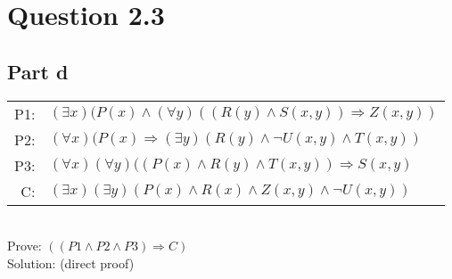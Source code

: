 \documentclass{article}
\begin{document}
	\section{Question 2.3}
		\subsection{Part d}
			\begin{tabular}{r l}
				P1: & $(\exists x)(P(x) \land (\forall y)((R(y) \land S(x, y)) \Rightarrow Z(x, y))$ \\
				P2: & $(\forall x)(P(x) \Rightarrow (\exists y)(R(y) \land \lnot U(x, y) \land T(x, y))$ \\
				P3: & $(\forall x)(\forall y)((P(x) \land R(y) \land T(x, y)) \Rightarrow S(x, y)$ \\ \hline
				C: & $(\exists x)(\exists y)(P(x) \land R(x) \land Z(x, y) \land \lnot U(x, y))$ \\
			\end{tabular}
			\newline \\
			Prove: $((P1 \land P2 \land P3) \Rightarrow C)$ \\
			Solution: (direct proof) \\
\end{document}
